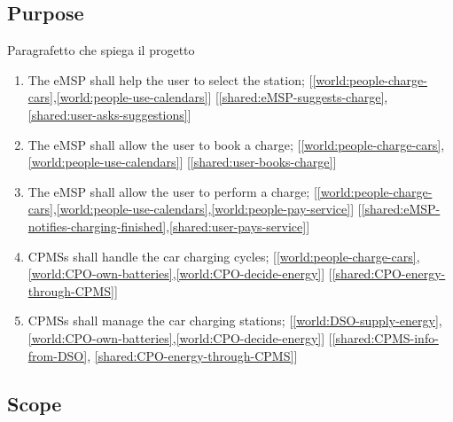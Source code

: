 

\subsection{Purpose}
Paragrafetto che spiega il progetto

%
\begin{enumerate}[label=G\arabic*]
    \item The \ac{eMSP} shall help the user to select the station; \label{goal:eMSP-helps-selecting} [\ref{world:people-charge-cars},\ref{world:people-use-calendars}] [\ref{shared:eMSP-suggests-charge},\ref{shared:user-asks-suggestions}]
    \item The \ac{eMSP} shall allow the user to book a charge; \label{goal:eMSP-booking-charge} [\ref{world:people-charge-cars},\ref{world:people-use-calendars}] [\ref{shared:user-books-charge}]
    \item The \ac{eMSP} shall allow the user to perform a charge; \label{goal:eMSP-allow-charge} [\ref{world:people-charge-cars},\ref{world:people-use-calendars},\ref{world:people-pay-service}] [\ref{shared:eMSP-notifies-charging-finished},\ref{shared:user-pays-service}]
    \item \acp{CPMS} shall handle the car charging cycles; \label{goal:CPMS-handles-charge} [\ref{world:people-charge-cars},\ref{world:CPO-own-batteries},\ref{world:CPO-decide-energy}] [\ref{shared:CPO-energy-through-CPMS}]
    \item \acp{CPMS} shall manage the car charging stations; \label{goal:CPMS-manage-station} [\ref{world:DSO-supply-energy},\ref{world:CPO-own-batteries},\ref{world:CPO-decide-energy}] [\ref{shared:CPMS-info-from-DSO}, \ref{shared:CPO-energy-through-CPMS}]
\end{enumerate}

\subsection{Scope}

